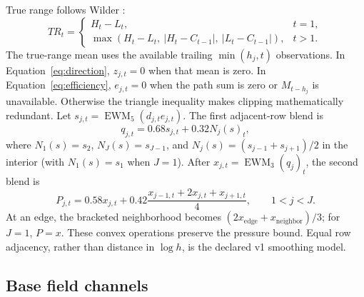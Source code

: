 \documentclass{article}
\newcommand{\pressure}{P}
\newcommand{\EWM}{\operatorname{EWM}}
\begin{document}
True range follows Wilder \citep{wilder1978new}:
\begin{equation}
TR_t=\begin{cases}
H_t-L_t,&t=1,\\
\max(H_t-L_t,\ |H_t-C_{t-1}|,\ |L_t-C_{t-1}|),&t>1.
\end{cases}
\end{equation}
The true-range mean uses the available trailing $\min(h_j,t)$ observations. In Equation~\ref{eq:direction}, $z_{j,t}=0$ when that mean is zero. In Equation~\ref{eq:efficiency}, $e_{j,t}=0$ when the path sum is zero or $M_{t-h_j}$ is unavailable. Otherwise the triangle inequality makes clipping mathematically redundant. Let
$s_{j,t}=\EWM_5(d_{j,t}e_{j,t})$. The first adjacent-row blend is
\begin{equation}
q_{j,t}=0.68s_{j,t}+0.32N_j(s)_t,
\end{equation}
where $N_1(s)=s_2$, $N_J(s)=s_{J-1}$, and
$N_j(s)=(s_{j-1}+s_{j+1})/2$ in the interior (with $N_1(s)=s_1$ when $J=1$). After $x_{j,t}=\EWM_3(q_j)_t$, the second blend is
\begin{equation}
\pressure_{j,t}=0.58x_{j,t}
+0.42\frac{x_{j-1,t}+2x_{j,t}+x_{j+1,t}}{4},\qquad 1<j<J.
\end{equation}
At an edge, the bracketed neighborhood becomes $(2x_{\mathrm{edge}}+x_{\mathrm{neighbor}})/3$; for $J=1$, $\pressure=x$. These convex operations preserve the pressure bound. Equal row adjacency, rather than distance in $\log h$, is the declared v1 smoothing model.

\subsection{Base field channels}
\end{document}
